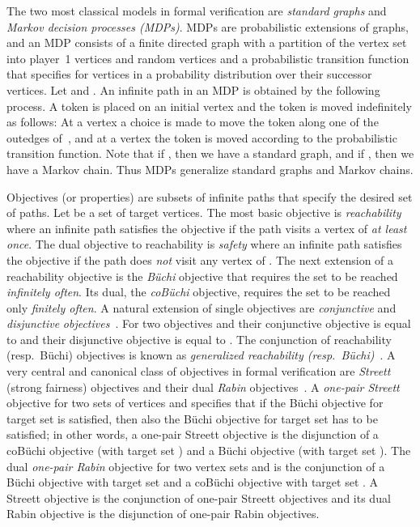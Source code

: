 \documentclass[11pt,letterpaper]{article}
\newcommand{\lu}{\textup{(}}
\newcommand{\ru}{\textup{)}\xspace}
\newcommand{\upbr}[1]{\lu #1\ru}
\newif\iffullversion
\newcommand{\infull}[1]{\iffullversion #1\fi}
\newcommand{\inshort}[1]{\iffullversion \else #1\fi}
\begin{document}
\smallskip{} 
The two most classical models in formal verification are 
\emph{standard graphs} and \emph{Markov decision processes \upbr{MDPs}}. 
MDPs are probabilistic extensions of graphs, 
and an MDP consists of a finite 
directed graph  with a partition of the vertex set~ into 
player~1 vertices  and random vertices 
and a probabilistic transition function that specifies for vertices in 
a probability distribution over their successor vertices. 
Let  and . 
An infinite path in an MDP is obtained by the following process. 
A token is placed on an initial vertex and the token is moved indefinitely 
as follows: At a vertex  a choice is made to move the token along 
one of the outedges of~, and at a vertex  the token is moved 
according to the probabilistic transition function. 
Note that if , then we have a standard graph, and 
if , then we have a Markov chain.
Thus MDPs generalize standard graphs and Markov chains.

\smallskip{}
Objectives (or properties) are subsets of infinite paths that specify the 
desired set of paths. \inshort{Let  be a set of target
vertices.}
The most basic objective is \emph{reachability} where\infull{, given a set 
 of \emph{target} vertices,} an infinite path satisfies the 
objective if the path visits a vertex of  {\em at least once}.
The dual objective to reachability is \emph{safety} where\infull{, given a set 
 of \emph{target} vertices,} an infinite path satisfies the 
objective if the path does \emph{not} visit any vertex of .
The next extension of a reachability objective is the 
\emph{Büchi} objective that requires the set\infull{ of target vertices}\inshort{~} 
to be reached \emph{infinitely often}. Its dual, the \emph{coBüchi} objective, 
requires the set\infull{ of target vertices}\inshort{~} to be reached only \emph{finitely often}.
A natural extension of single objectives are \emph{conjunctive} and \emph{disjunctive} 
\emph{objectives}~\cite{FijalkowH12,Wolper00,ChatterjeeHP07}. For two objectives
 and  their conjunctive objective is equal to 
and their disjunctive objective is equal to .
The conjunction of reachability (resp.\ Büchi) objectives is known as 
\emph{generalized reachability \upbr{resp.\ Büchi}}~\cite{FijalkowH12,Wolper00}.
A very central and canonical class of objectives in formal verification are 
\emph{Streett} (strong fairness) objectives and their dual \emph{Rabin} objectives~\cite{Thomas97}.
A \emph{one-pair Streett} objective for two sets of vertices  and  specifies
that if the Büchi objective for target set  is satisfied, then also the Büchi
objective for target set  has to be satisfied; in other words, a one-pair 
Streett objective is the disjunction of a coBüchi objective (with target set 
) and a Büchi objective (with target set ).
The dual \emph{one-pair Rabin} objective for two vertex sets  and  
is the conjunction of a Büchi objective with target set  and a
coBüchi objective with target set .
A Streett objective is the conjunction of  one-pair Streett objectives
and its dual Rabin objective is the disjunction of  one-pair Rabin objectives.
\end{document}
